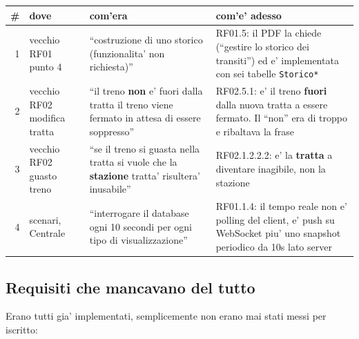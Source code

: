 \documentclass[11pt]{article}
\begin{document}
\begin{center}
\begin{tabular}{rlll}
\# & dove & com'era & com'e' adesso\\
\hline
1 & vecchio RF01 punto 4 & ``costruzione di uno storico (funzionalita' non richiesta)'' & RF01.5: il PDF la chiede (``gestire lo storico dei transiti'') ed e' implementata con sei tabelle \texttt{Storico*}\\
2 & vecchio RF02 modifica tratta & ``il treno \textbf{non} e' fuori dalla tratta il treno viene fermato in attesa di essere soppresso'' & RF02.5.1: e' il treno \textbf{fuori} dalla nuova tratta a essere fermato. Il ``non'' era di troppo e ribaltava la frase\\
3 & vecchio RF02 guasto treno & ``se il treno si guasta nella tratta si vuole che la \textbf{stazione} tratta' risultera' inusabile'' & RF02.1.2.2.2: e' la \textbf{tratta} a diventare inagibile, non la stazione\\
4 & scenari, Centrale & ``interrogare il database ogni 10 secondi per ogni tipo di visualizzazione'' & RF01.1.4: il tempo reale non e' polling del client, e' push su WebSocket piu' uno snapshot periodico da 10s lato server\\
\end{tabular}
\end{center}
\subsection{Requisiti che mancavano del tutto}
\label{sec:orgaaf6c2d}

Erano tutti gia' implementati, semplicemente non erano mai stati messi per iscritto:
\end{document}
